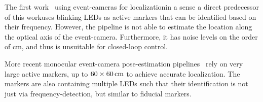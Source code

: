 The first work~\cite{censi2013activeled} using event-cameras for localization\textemdash in a sense a direct predecessor of this work\textemdash uses blinking LEDs as active markers that can be identified based on their frequency. However, the pipeline is not able to estimate the location along the optical axis of the event-camera. Furthermore, it has noise levels on the order of \unit[10]{cm}, and thus is unsuitable for closed-loop control.

More recent monocular event-camera pose-estimation pipelines~\cite{salah2022neuromorphicvisionbased, ebmer2024realtime6dof} rely on very large active markers, up to $\unit[60\times 60]{cm}$ to achieve accurate localization. The markers are also containing multiple LEDs such that their identification is not just via frequency-detection, but similar to fiducial markers. 


